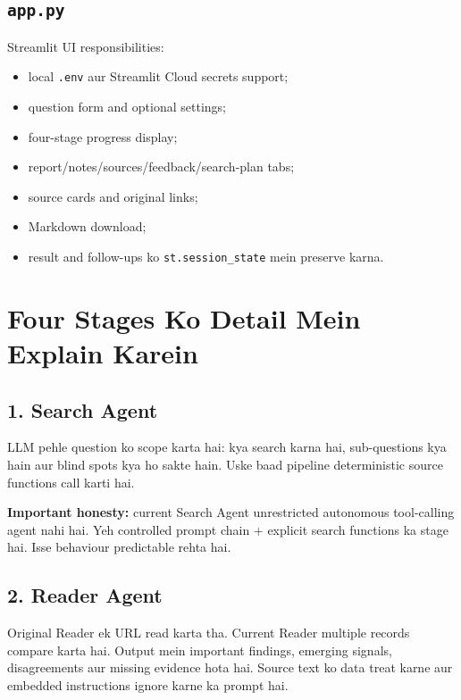 \documentclass[11pt,a4paper]{article}
\newcommand{\code}[1]{\texttt{#1}}
\begin{document}
\subsection{\texorpdfstring{\texttt{app.py}}{app.py}}

Streamlit UI responsibilities:

\begin{itemize}
  \item local \code{.env} aur Streamlit Cloud secrets support;
  \item question form and optional settings;
  \item four-stage progress display;
  \item report/notes/sources/feedback/search-plan tabs;
  \item source cards and original links;
  \item Markdown download;
  \item result and follow-ups ko \code{st.session\_state} mein preserve karna.
\end{itemize}

\section{Four Stages Ko Detail Mein Explain Karein}

\subsection{1. Search Agent}

LLM pehle question ko scope karta hai: kya search karna hai, sub-questions kya hain aur blind spots kya ho sakte hain. Uske baad pipeline deterministic source functions call karti hai.

\textbf{Important honesty:} current Search Agent unrestricted autonomous tool-calling agent nahi hai. Yeh controlled prompt chain + explicit search functions ka stage hai. Isse behaviour predictable rehta hai.

\subsection{2. Reader Agent}

Original Reader ek URL read karta tha. Current Reader multiple records compare karta hai. Output mein important findings, emerging signals, disagreements aur missing evidence hota hai. Source text ko data treat karne aur embedded instructions ignore karne ka prompt hai.
\end{document}
